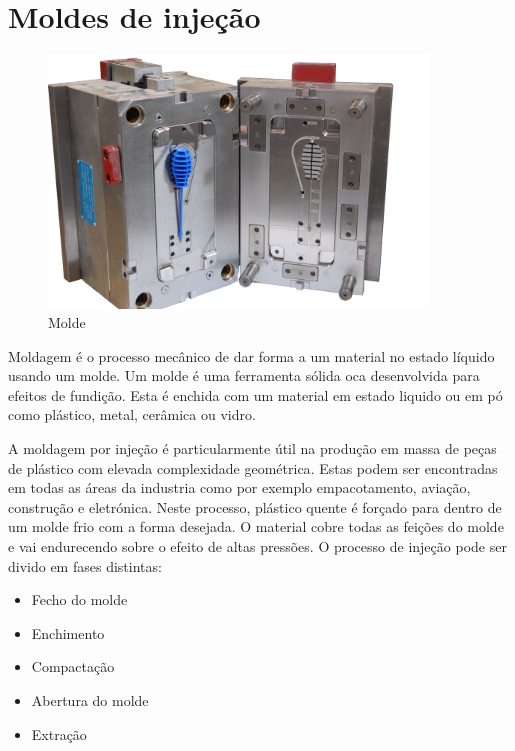 \documentclass[11pt,twoside,a4paper]{report}
\begin{document}
\section{Moldes de injeção}
\begin{figure}[H]
	\begin{center}
		\includegraphics[width=0.9\textwidth]{molde} %
		\caption{Molde}
		\label{fig:molde}
	\end{center}
\end{figure}
Moldagem é o processo mecânico de dar forma a um material no estado líquido usando um molde\cite{definicao_moldagem,definicao_moldar}. Um molde é uma ferramenta sólida oca desenvolvida para efeitos de fundição\cite{definicao_molde}. Esta é enchida com um material em estado liquido ou em pó como plástico, metal, cerâmica ou vidro\cite{Williams1975,Trovant1998,JanneyMarkA.Knoxville1991,Yan2009}.\par
A moldagem por injeção é particularmente útil na produção em massa de peças de plástico com elevada complexidade geométrica\cite{Shen,Shelesh}. Estas podem ser encontradas em todas as áreas da industria como por exemplo empacotamento, aviação, construção e eletrónica\cite{Ozcelik}. Neste processo, plástico quente é forçado para dentro de um molde frio com a forma desejada. O material cobre todas as feições do molde e vai endurecendo sobre o efeito de altas pressões. O processo de injeção pode ser divido em fases distintas\cite{Shen}:
\begin{itemize}[noitemsep]
	\item Fecho do molde
	\item Enchimento
	\item Compactação
	\item Abertura do molde
	\item Extração
\end{itemize}
\end{document}

